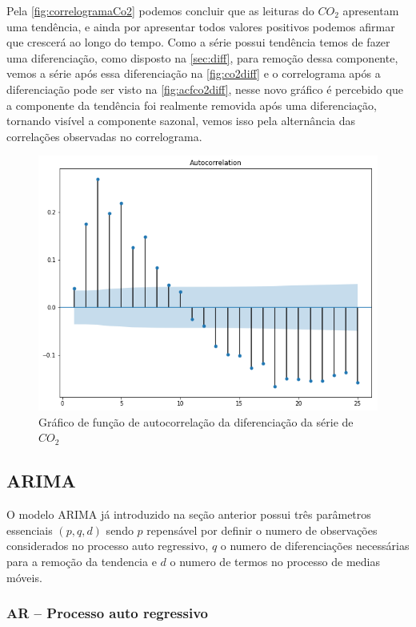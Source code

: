 \documentclass[
    12pt,
    oneside,
    a4paper,
    english,
    brazil
]{abntex2}
\begin{document}
Pela \autoref{fig:correlogramaCo2} podemos concluir que as leituras do $CO_2$
apresentam uma tendência, e ainda por apresentar todos valores positivos
podemos afirmar que crescerá ao longo do tempo. Como a série possui tendência
temos de fazer uma diferenciação, como disposto na \autoref{sec:diff}, para
remoção dessa componente, vemos a série após essa diferenciação na
\autoref{fig:co2diff} e o correlograma após a diferenciação pode ser visto na
\autoref{fig:acfco2diff}, nesse novo gráfico é percebido que a componente da
tendência foi realmente removida após uma diferenciação, tornando visível a
componente sazonal, vemos isso pela alternância das correlações observadas no
correlograma.

\begin{figure}
    \centering
    \caption{Gráfico de função de autocorrelação da diferenciação da série de
        $CO_2$}\label{fig:acfco2diff}
    \includegraphics[width=.6\linewidth]{images/acf_co2_diff.png}
\end{figure}


\subsection{ARIMA}

O modelo ARIMA já introduzido na seção anterior possui três parâmetros
essenciais $(p,q,d)$ sendo $p$ repensável por definir o numero de observações
considerados no processo auto regressivo, $q$ o numero de diferenciações
necessárias para a remoção da tendencia e $d$ o numero de termos no processo de
medias móveis.

\subsubsection{AR -- Processo auto regressivo}
\end{document}
